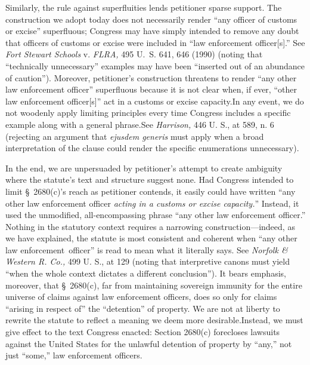   Similarly, the rule against superfluities lends petitioner sparse support. The construction we adopt today does not necessarily render ``any officer of customs or excise'' superfluous; Congress may have simply intended to remove any doubt that officers of customs or excise were included in ``law enforcement officer[s].'' See \emph{Fort Stewart Schools} v. \emph{FLRA,} 495 U.~S. 641, 646 (1990) (noting that ``technically unnecessary'' examples may have been ``inserted out of an abundance of caution''). Moreover, petitioner's construction threatens to render ``any other law enforcement officer'' superfluous because it is not clear when, if ever, ``other law enforcement \starpage officer[s]'' act in a customs or excise capacity.In any event, we do not woodenly apply limiting principles every time Congress includes a specific example along with a general phrase.See \emph{Harrison,} 446 U. S., at 589, n. 6 (rejecting an argument that \emph{ejusdem generis} must apply when a broad interpretation of the clause could render the specific enumerations unnecessary).

  In the end, we are unpersuaded by petitioner's attempt to create ambiguity where the statute's text and structure suggest none. Had Congress intended to limit \S~2680(c)'s reach as petitioner contends, it easily could have written ``any other law enforcement officer \emph{acting in a customs or excise capacity.}'' Instead, it used the unmodified, all-encompassing phrase ``any other law enforcement officer.'' Nothing in the statutory context requires a narrowing construction---indeed, as we have explained, the statute is most consistent and coherent when ``any other law enforcement\starpage\ officer'' is read to mean what it literally says. See \emph{Norfolk \& Western R. Co.,} 499 U. S., at 129 (noting that interpretive canons must yield ``when the whole context dictates a different conclusion''). It bears emphasis, moreover, that \S~2680(c), far from maintaining sovereign immunity for the entire universe of claims against law enforcement officers, does so only for claims ``arising in respect of'' the ``detention'' of property. We are not at liberty to rewrite the statute to reflect a meaning we deem more desirable.\footnotemark[7] Instead, we must give effect to the text Congress enacted: Section 2680(c) forecloses lawsuits against the United States for the unlawful detention of property by ``any,'' not just ``some,'' law enforcement officers.



